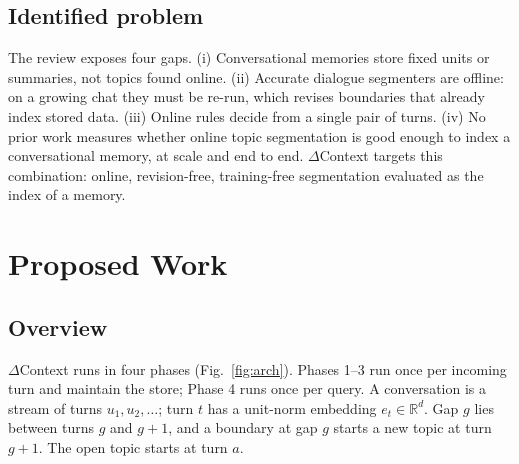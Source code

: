 \documentclass[journal]{IEEEtran}
\newcommand{\dc}{$\Delta$Context}
\begin{document}
\subsection{Identified problem}
The review exposes four gaps. (i) Conversational memories store fixed units or
summaries, not topics found online. (ii) Accurate dialogue segmenters are
offline: on a growing chat they must be re-run, which revises boundaries that
already index stored data. (iii) Online rules decide from a single pair of
turns. (iv) No prior work measures whether online topic segmentation is good
enough to index a conversational memory, at scale and end to end. \dc{}
targets this combination: online, revision-free, training-free segmentation
evaluated as the index of a memory.

\section{Proposed Work}
\label{sec:method}

\subsection{Overview}
\dc{} runs in four phases (Fig.~\ref{fig:arch}). Phases 1--3 run once per
incoming turn and maintain the store; Phase 4 runs once per query. A
conversation is a stream of turns $u_1,u_2,\dots$; turn $t$ has a unit-norm
embedding $e_t\in\mathbb{R}^d$. Gap $g$ lies between turns $g$ and $g{+}1$,
and a boundary at gap $g$ starts a new topic at turn $g{+}1$. The open topic
starts at turn $a$.
\end{document}
